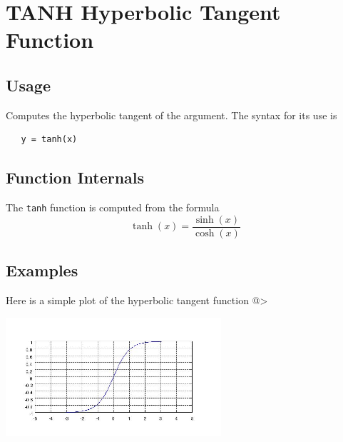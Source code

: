 \section{TANH Hyperbolic Tangent Function}

\subsection{Usage}

Computes the hyperbolic tangent of the argument.
The syntax for its use is
\begin{verbatim}
   y = tanh(x)
\end{verbatim}
\subsection{Function Internals}

The \verb|tanh| function is computed from the formula
\[
   \tanh(x) = \frac{\sinh(x)}{\cosh(x)}
\]
\subsection{Examples}

Here is a simple plot of the hyperbolic tangent function
@>


\centerline{\includegraphics[width=8cm]{tanhplot}}

